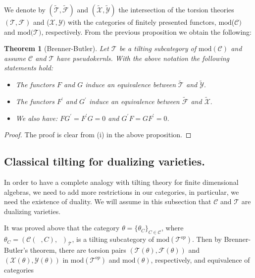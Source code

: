 \documentclass{amsart}
\newtheorem{theorem}{Theorem}
\theoremstyle{plain}
\numberwithin{equation}{section}
\begin{document}
We denote by $(\tilde{\mathscr{T}},\tilde{\mathscr{F}})$ and $(\tilde{\mathscr{X}},\tilde{\mathscr{Y}})$ the intersection of the torsion theories $(\mathscr T,\mathscr F)$ and ($\mathscr{X},\mathscr{Y})$ with the categories
of finitely presented functors, $\mathrm{mod}$($\mathcal{C})$ and $\mathrm{mod}(\mathcal{T)}$, respectively. From the previous proposition we obtain
the following:

\begin{theorem}[Brenner-Butler]
\label{bbre1} Let $\mathcal{T}$ be a tilting subcategory of $\mathrm{mod}(\mathcal{C})$ and assume $\mathcal{C}$ and $\mathcal{T}$ have pseudokernls.
With the above notation the following statements hold:

\begin{itemize}
\item[(i)] The functors $F$ and $G$ induce an equivalence between $\tilde{\mathscr{T}}$ and $\tilde{\mathscr{Y}}.$

\item[(ii)] The functors $F^{\prime}$ and $G^{\prime}$ induce an equivalence
between $\tilde{\mathscr{F}}$ and $\tilde{\mathscr{X}}.$

\item[(iii)] We also have: $FG^{\prime}=F^{\prime}G=0$ and $G^{\prime}F=GF^{\prime}=0$.
\end{itemize}
\end{theorem}

\begin{proof}
The proof is clear from (i) in the above proposition.
\end{proof}

\subsection{Classical tilting for dualizing varieties.}

In order to have a complete analogy with tilting theory for finite
dimensional algebras, we need to add more restrictions in our categories, in
particular, we need the existence of duality. We will assume in this
subsection that $\mathcal{C}$ and $\mathcal{T}$ are dualizing varieties.

It was proved above that the category $\theta =\{\theta _{C}\}_{C\in
\mathcal{C}}$, where $\theta _{C}=(\mathcal{C}(\;\;,C),\;\;)_{\mathcal{T}}$,
is a tilting subcategory of $\mathrm{mod}(\mathcal{T}^{op}).$ Then by
Brenner-Butler's theorem, there are torsion pairs $(\mathscr{T}(\theta ),\mathscr{F}(\theta ))$ and $(\mathscr{X}(\theta ),\mathscr{Y}(\theta ))$ in $\mathrm{mod}(\mathcal{T}^{op})$ and $\mathrm{mod}(\theta )$, respectively,
and equivalence of categories
\end{document}
